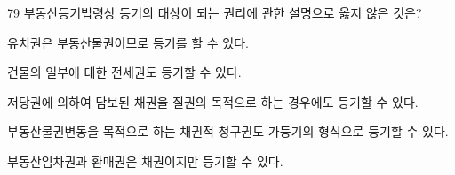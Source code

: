 \begin{question}{79}
부동산등기법령상 등기의 대상이 되는 권리에 관한 설명으로 옳지 \uline{않은} 것은?
\begin{choices}
  \item 유치권은 부동산물권이므로 등기를 할 수 있다.
  \item 건물의 일부에 대한 전세권도 등기할 수 있다.
  \item 저당권에 의하여 담보된 채권을 질권의 목적으로 하는 경우에도 등기할 수 있다.
  \item 부동산물권변동을 목적으로 하는 채권적 청구권도 가등기의 형식으로 등기할 수 있다.
  \item 부동산임차권과 환매권은 채권이지만 등기할 수 있다.
\end{choices}
\end{question}
